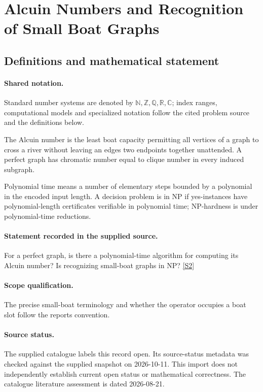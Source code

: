 \documentclass[11pt]{article}
\newcommand{\sref}[2]{\hyperlink{source:#1:#2}{[S#2]}}
\begin{document}
\section{Alcuin Numbers and Recognition of Small Boat Graphs}\label{statement}

\subsection{Definitions and mathematical statement}

\paragraph{Shared notation.}Standard number systems are denoted by $\mathbb N,\mathbb Z,\mathbb Q,\mathbb R,\mathbb C$; index ranges, computational models and specialized notation follow the cited problem source and the definitions below.


The Alcuin number is the least boat capacity permitting all vertices of a graph to cross a river without leaving an edge\textquotesingle s two endpoints together unattended. A perfect graph has chromatic number equal to clique number in every induced subgraph.

Polynomial time means a number of elementary steps bounded by a polynomial in the encoded input length. A decision problem is in $\mathrm{NP}$ if yes-instances have polynomial-length certificates verifiable in polynomial time; NP-hardness is under polynomial-time reductions.
\paragraph{Statement recorded in the supplied source.}
For a perfect graph, is there a polynomial-time algorithm for computing its Alcuin number? Is recognizing small-boat graphs in NP? \sref{statement}{2}
\paragraph{Scope qualification.}
The precise small-boat terminology and whether the operator occupies a boat slot follow the report\textquotesingle s convention.
\paragraph{Source status.}
The supplied catalogue labels this record open. Its source-status metadata was checked against the supplied snapshot on 2026-10-11. This import does not independently establish current open status or mathematical correctness. The catalogue literature assessment is dated 2026-08-21.
\end{document}
